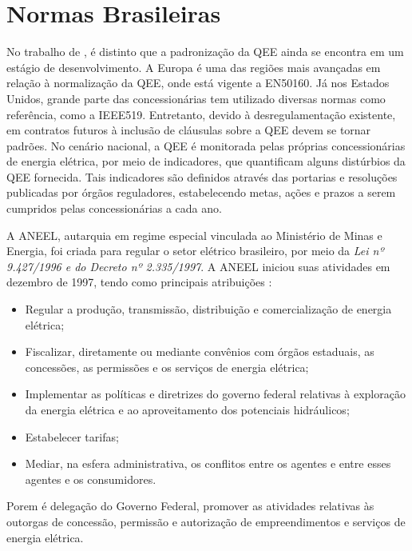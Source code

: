 \section{Normas Brasileiras}\label{qeeNormas}
\par
No trabalho de \cite{JUN09}, é distinto que a padronização da \ac{QEE} ainda se encontra em um estágio de desenvolvimento. A Europa é uma das regiões mais avançadas em relação à normalização da \ac{QEE}, onde está vigente a EN50160. Já nos Estados Unidos, grande parte das concessionárias tem utilizado diversas normas como referência, como a IEEE519. Entretanto, devido à desregulamentação existente, em contratos futuros à inclusão de cláusulas sobre a QEE devem se tornar padrões.
No cenário nacional, a QEE é monitorada pelas próprias concessionárias de energia elétrica, por meio de indicadores, que quantificam alguns distúrbios da QEE fornecida. Tais indicadores são definidos através das portarias e resoluções publicadas por órgãos reguladores, estabelecendo metas, ações e prazos a serem cumpridos pelas concessionárias a cada ano.
\par
A ANEEL, autarquia em regime especial vinculada ao Ministério de Minas e Energia, foi criada para regular o setor elétrico brasileiro, por meio da \emph{Lei nº 9.427/1996 e do Decreto nº 2.335/1997}. A \ac{ANEEL} iniciou suas atividades em dezembro de 1997, tendo como principais atribuições \citep{ANEEL}:
\begin{itemize}
\item Regular a produção, transmissão, distribuição e comercialização de energia elétrica;
\item Fiscalizar, diretamente ou mediante convênios com órgãos estaduais, as concessões, as permissões e os serviços de energia elétrica;
\item Implementar as políticas e diretrizes do governo federal relativas à exploração da energia elétrica e ao aproveitamento dos potenciais hidráulicos;
\item Estabelecer tarifas;
\item Mediar, na esfera administrativa, os conflitos entre os agentes e entre esses agentes e os consumidores.
\end{itemize}
\par
Porem é delegação do Governo Federal, promover as atividades relativas às outorgas de concessão, permissão e autorização de empreendimentos e serviços de energia elétrica.

